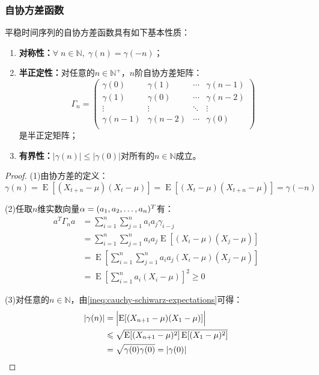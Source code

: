 \subsubsection{自协方差函数}
\begin{property}
	平稳时间序列的自协方差函数具有如下基本性质：
	\begin{enumerate}
		\item \textbf{对称性：}$\forall\;n\in\mathbb{N},\;\gamma(n)=\gamma(-n)$；
		\item \textbf{半正定性：}对任意的$n\in\mathbb{N}^+$，$n$阶自协方差矩阵：
		\begin{equation*}
			\Gamma_n=
			\begin{pmatrix}
				\gamma(0) & \gamma(1) & \cdots & \gamma(n-1) \\
				\gamma(1) & \gamma(0) & \cdots & \gamma(n-2) \\
				\vdots & \vdots & \ddots & \vdots \\
				\gamma(n-1) & \gamma(n-2) & \cdots & \gamma(0) \\
			\end{pmatrix}
		\end{equation*}
		是半正定矩阵；
		\item \textbf{有界性：}$|\gamma(n)|\leqslant|\gamma(0)|$对所有的$n\in\mathbb{N}$成立。
	\end{enumerate}
\end{property}
\begin{proof}
	(1)由协方差的定义：
	\begin{equation*}
		\gamma(n)=\operatorname{E}[(X_{t+n}-\mu)(X_t-\mu)]=\operatorname{E}[(X_t-\mu)(X_{t+n}-\mu)]=\gamma(-n)
	\end{equation*}\par
	(2)任取$n$维实数向量$\alpha=(a_1, a_2, \dots, a_{n})^T$有：
	\begin{align*}
		a^T\Gamma_na
		&=\sum_{i=1}^{n}\sum_{j=1}^{n}a_ia_j\gamma_{i-j} \\
		&=\sum_{i=1}^{n}\sum_{j=1}^{n}a_ia_j\operatorname{E}[(X_i-\mu)(X_j-\mu)]\\
		&=\operatorname{E}\left[\sum_{i=1}^{n}\sum_{j=1}^{n}a_ia_j(X_i-\mu)(X_j-\mu)\right] \\
		&=\operatorname{E}\left[\sum_{i=1}^{n}a_i(X_i-\mu)\right]^2\geqslant0
	\end{align*}\par
	(3)对任意的$n\in \mathbb{N}$，由\cref{ineq:cauchy-schiwarz-expectations}可得：
	\begin{align*}
		|\gamma(n)|
		&=\Bigl|\operatorname{E}[(X_{n+1}-\mu)(X_1-\mu)]\Bigr| \\
		&\leqslant\sqrt{\operatorname{E}[(X_{n+1}-\mu)^2]\operatorname{E}[(X_1-\mu)^2]} \\
		&=\sqrt{\gamma(0)\gamma(0)}=|\gamma(0)|\qedhere
	\end{align*}
\end{proof}
